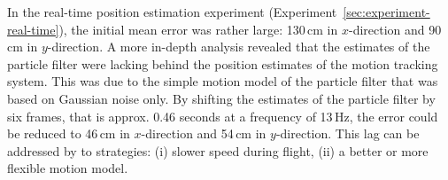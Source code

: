 In the real-time position estimation experiment (Experiment~\ref{sec:experiment-real-time}), the initial mean error was rather large: 130\,cm in $x$-direction and 90\,cm in $y$-direction. A more in-depth analysis revealed that the estimates of the particle filter were lacking behind the position estimates of the motion tracking system. This was due to the simple motion model of the particle filter that was based on Gaussian noise only. By shifting the estimates of the particle filter by six frames, that is approx. 0.46 seconds at a frequency of 13\,Hz, the error could be reduced to 46\,cm in $x$-direction and 54\,cm in $y$-direction. This lag can be addressed by to strategies: (i) slower speed during flight, (ii) a better or more flexible motion model. 